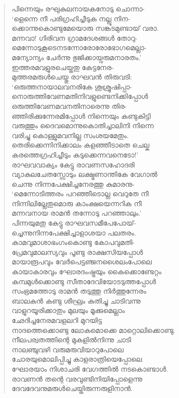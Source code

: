 \begin{verse}
പിന്നെയും രഘുകുലനായകനോടു ചൊന്നാ-\\
‘ളെന്നെ നീ പരിഗ്രഹിച്ചീടുക നല്ലൂ നിന-\\
ക്കൊന്നുകൊണ്ടുമേയൊരു സങ്കടമുണ്ടായ് വരാ.\\
മന്നവാ! ഗിരിവന ഗ്രാമദേശങ്ങള്‍ തോറു-\\
മെന്നോടുകൂടെനടന്നോരോരോഭോഗമെല്ലാ-\\
മന്യോന്യം ചേര്‍ന്നു ഭുജിക്കായ്വരുമനാരതം.’\\
ഇത്തരമവളുരചെയ്തതു കേട്ടനേര-\\
മുത്തരമരുള്‍ചെയ്തു രാഘവന്‍ തിരുവടി:\\
‘ഒരുത്തനായാലവനരികേ ശൂശ്രൂഷിപ്പാ-\\
നൊരുത്തിവേണമതിനിവളുണ്ടെനിക്കിപ്പോള്‍\\
ഒരുത്തിവേണമവനതിനാരെന്നു തിര-\\
ഞ്ഞിരിക്കുന്നേരമിപ്പോള്‍ നിന്നെയും കണ്ടുകിട്ടി\\
വരുത്തും ദൈവമൊന്നുകൊതിച്ചാലിനി നിന്നെ\\
വരിച്ചു കൊള്ളുമവനില്ല സംശയമേതും.\\
തെരിക്കെന്നിനിക്കാലം കളഞ്ഞീടാതെ ചെല്ക\\
കരത്തെഗ്രഹിച്ചീടും കടുക്കെന്നവനെടോ!’\\
രാഘവവാക്യം കേട്ടു രാവണസഹോദരി\\
വ്യാകുലചേതസ്സോടും ലക്ഷ്മണാന്തികേ വേഗാല്‍\\
ചെന്നു നിന്നപേക്ഷിച്ചനേരത്തു കുമാരനു-\\
‘മെന്നോടിത്തരം പറഞ്ഞീടൊല്ല വെറുതേ നീ\\
നിന്നിലില്ലേതുമൊരു കാംക്ഷയെന്നറിക നീ\\
മന്നവനായ രാമന്‍ തന്നോടു പറഞ്ഞാലും.’\\
പിന്നയുമതു കേട്ടു രാഘവസമീപേപോയ്-\\
ച്ചെന്നുനിന്നപേക്ഷിച്ചാളാശയാ പലതരം.\\
കാമവുമാശാഭംഗംകൊണ്ടു കോപവുമതി-\\
പ്രേമവുമാലസ്യവും പൂണ്ടു രാക്ഷസിയപ്പോള്‍\\
മായാരൂപവും വേര്‍പെട്ടഞ്ജനശൈലംപോലെ\\
കായാകാരവും ഘോരദംഷ്ട്രയും കൈക്കൊണ്ടേറ്റം\\
കമ്പമുള്‍ക്കൊണ്ടു സീതാദേവിയോടടുത്തപ്പോള്‍\\
സംഭ്രമത്തോടു രാമന്‍ തടുത്തു നിര്‍ത്തുന്നേരം\\
ബാലകന്‍ കണ്ടു ശീഘ്രം കുതിച്ചു ചാടിവന്നു\\
വാളുറയൂരിക്കാതും മുലയും മൂക്കുമെല്ലാം\\
ഛേദിച്ചനേരമവളലറി മുറയിട്ട\\
നാദത്തെക്കൊണ്ടു ലോകമൊക്കെ മാറ്റൊലിക്കൊണ്ടു.\\
നീലപര്വതത്തിന്റെ മുകളില്‍നിന്നു ചാടി\\
നാലഞ്ചുവഴി വരുമരുവിയാറുപോലെ\\
ചോരയുമൊലിപ്പിച്ചു കാളരാത്രിയെപ്പോലെ\\
ഘോരയാം നിശാചരി വേഗത്തില്‍ നടകൊണ്ടാള്‍.\\
രാവണന്‍ തന്റെ വരവുണ്ടിനിയിപ്പോളെന്നു\\
ദേവദേവനുമരുള്‍ചെയ്തിരുന്നരുളിനാന്‍.
\end{verse}

